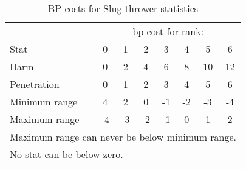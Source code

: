 
\begin{table}\centering
\begin{tabular}{l*7c}
\toprule
{}		& \multicolumn{7}{c}{bp cost for rank:} \\
Stat		& 0	& 1	& 2	& 3	& 4	& 5	& 6 \\
\midrule
Harm		& 0	& 2	& 4	& 6	& 8	& 10	& 12\\
Penetration	& 0	& 1	& 2	& 3	& 4	& 5	& 6 \\
Minimum range	& 4	& 2	& 0	& -1	& -2	& -3	& -4\\
Maximum range	& -4	& -3	& -2	& -1	& 0	& 1	& 2 \\
\bottomrule
\multicolumn{8}{p{0.7\columnwidth}}{
Maximum range can never be below minimum range.
}\\
\multicolumn{8}{p{0.7\columnwidth}}{
No stat can be below zero.
}
\end{tabular}
\caption{BP costs for Slug-thrower statistics}
\label{tab:slug-thrower-statistics}
\end{table}
